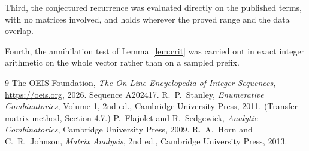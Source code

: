 \documentclass[11pt,a4paper]{article}
\theoremstyle{plain}
\theoremstyle{definition}
\begin{document}
Third, the conjectured recurrence was evaluated directly on the published terms, with no
matrices involved, and holds wherever the proved range and the data overlap.

Fourth, the annihilation test of Lemma~\ref{lem:crit} was carried out in exact integer
arithmetic on the whole vector rather than on a sampled prefix.

\begin{thebibliography}{9}
 The OEIS Foundation, \emph{The On-Line Encyclopedia of Integer
Sequences}, \url{https://oeis.org}, 2026. Sequence A202417.
 R.~P.~Stanley, \emph{Enumerative Combinatorics}, Volume 1, 2nd ed.,
Cambridge University Press, 2011. (Transfer-matrix method, Section 4.7.)
 P.~Flajolet and R.~Sedgewick, \emph{Analytic Combinatorics}, Cambridge
University Press, 2009.
 R.~A.~Horn and C.~R.~Johnson, \emph{Matrix Analysis}, 2nd ed., Cambridge
University Press, 2013.
\end{thebibliography}
\end{document}
